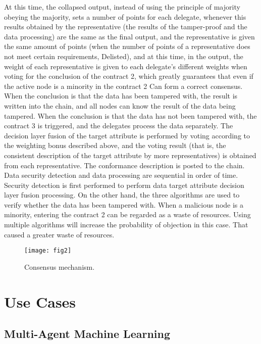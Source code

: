 \documentclass{ieeeaccess}
\begin{document}
At this time, the collapsed output, instead of using the principle of majority obeying the majority, sets a number of points for each delegate, whenever this results obtained by the representative (the results of the tamper-proof and the data processing) are the same as the final output, and the representative is given the same amount of points (when the number of points of a representative does not meet certain requirements, Delisted), and at this time, in the output, the weight of each representative is given to each delegate's different weights when voting for the conclusion of the contract 2, which greatly guarantees that even if the active node is a minority in the contract 2 Can form a correct consensus. When the conclusion is that the data has been tampered with, the result is written into the chain, and all nodes can know the result of the data being tampered. When the conclusion is that the data has not been tampered with, the contract 3 is triggered, and the delegates process the data separately. The decision layer fusion of the target attribute is performed by voting according to the weighting bonus described above, and the voting result (that is, the consistent description of the target attribute by more representatives) is obtained from each representative. The conformance description is posted to the chain. Data security detection and data processing are sequential in order of time. Security detection is first performed to perform data target attribute decision layer fusion processing. On the other hand, the three algorithms are used to verify whether the data has been tampered with. When a malicious node is a minority, entering the contract 2 can be regarded as a waste of resources. Using multiple algorithms will increase the probability of objection in this case. That caused a greater waste of resources.
\begin{figure}[htbp]
\begin{center}
\texttt{[image: fig2]}
\caption{Consensus mechanism.}
\label{f}
\end{center}
\end{figure}

\section{Use Cases}

\subsection{Multi-Agent Machine Learning}
\end{document}
